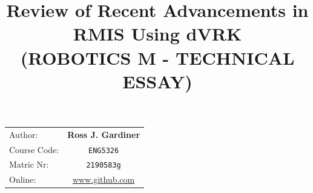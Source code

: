 \documentclass[english]{sobraep}
\title{Review of Recent Advancements in RMIS Using dVRK\\(ROBOTICS M - TECHNICAL ESSAY)}
\begin{document}
\maketitle
\begin{tabular}{l|c}
 Author: & \textbf{Ross J. Gardiner}   \\
 Course Code: & \verb|ENG5326| \\
 Matric Nr: & \verb|2190583g| \\
 Online: & \url{www.github.com}   \\
\end{tabular}
    
        
            
    
        
        
        
        
        
    
        
            
\end{document}
